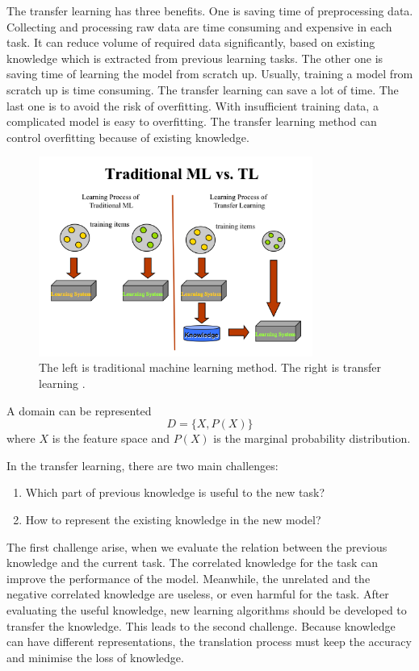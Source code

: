 The transfer learning has three benefits. One is saving time of preprocessing data. Collecting and processing raw data are time consuming and expensive in each task. It can reduce volume of required data significantly, based on existing knowledge which is extracted from previous learning tasks. The other one is saving time of learning the model from scratch up. Usually, training a model from scratch up is time consuming. The transfer learning can save a lot of time. The last one is to avoid the risk of overfitting. With insufficient training data, a complicated model is easy to overfitting. The transfer learning method can control overfitting because of existing knowledge.

\graphicspath{ {./Figures/} }
\begin{figure}[!htb]
\centering
\includegraphics[width=0.8\textwidth]{MLvsTL.png}
\caption{\label{fig:TransferLearning}The left is traditional machine learning method. The right is transfer learning \citep{TransferlearningDiagram}.}
\end{figure}

A domain can be represented
\begin{equation}\label{eq:TransLearning}
D = \{ X, P(X) \}
\end{equation}
where $X$ is the feature space and $P(X)$ is the marginal probability distribution. 

In the transfer learning, there are two main challenges: 
\begin{enumerate}
  \item Which part of previous knowledge is useful to the new task?
  \item How to represent the existing knowledge in the new model?
\end{enumerate}
The first challenge arise, when we evaluate the relation between the previous knowledge and the current task. The correlated knowledge for the task can improve the performance of the model. Meanwhile, the unrelated and the negative correlated knowledge are useless, or even harmful for the task. After evaluating the useful knowledge, new learning algorithms should be developed to transfer the knowledge. This leads to the second challenge. Because knowledge can have different representations, the translation process must keep the accuracy and minimise the loss of knowledge. 